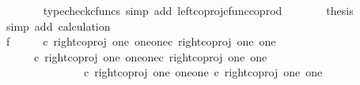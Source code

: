 \begin{isabellebody}
\ \ \ \ \ \ \isamarkupfalse%
\ {\isacharparenleft}{\kern0pt}typecheck{\isacharunderscore}{\kern0pt}cfuncs{\isacharcomma}{\kern0pt}\ simp\ add{\isacharcolon}{\kern0pt}\ left{\isacharunderscore}{\kern0pt}coproj{\isacharunderscore}{\kern0pt}cfunc{\isacharunderscore}{\kern0pt}coprod{\isacharparenright}{\kern0pt}\isanewline
\ \ \ \ \isamarkupfalse%
\ \isamarkupfalse%
\ {\isacharquery}{\kern0pt}thesis\isanewline
\ \ \ \ \ \ \isamarkupfalse%
\ {\isacharparenleft}{\kern0pt}simp\ add{\isacharcolon}{\kern0pt}\ calculation{\isacharparenright}{\kern0pt}\isanewline
\ \ \isamarkupfalse%
\isanewline
\ \ \isamarkupfalse%
\ f{}{\isacharcolon}{\kern0pt}\ {\isachardoublequoteopen}{\isasymlangle}{\isasymt}{\isacharcomma}{\kern0pt}{\isasymt}{\isasymrangle}\ {\isasymamalg}\ {\isasymlangle}{\isasymt}{\isacharcomma}{\kern0pt}{\isasymf}{\isasymrangle}\ {\isasymamalg}\ {\isasymlangle}{\isasymf}{\isacharcomma}{\kern0pt}{\isasymt}{\isasymrangle}\ {\isasymcirc}\isactrlsub c\ {\isacharparenleft}{\kern0pt}right{\isacharunderscore}{\kern0pt}coproj\ one\ {\isacharparenleft}{\kern0pt}one{\isasymCoprod}one{\isacharparenright}{\kern0pt}{\isasymcirc}\isactrlsub c\ right{\isacharunderscore}{\kern0pt}coproj\ one\ one{\isacharparenright}{\kern0pt}\ {\isacharequal}{\kern0pt}\ {\isasymlangle}{\isasymf}{\isacharcomma}{\kern0pt}{\isasymt}{\isasymrangle}{\isachardoublequoteclose}\isanewline
\ \ \isamarkupfalse%
{\isacharminus}{\kern0pt}\ \isanewline
\ \ \ \ \isamarkupfalse%
\ {\isachardoublequoteopen}{\isasymlangle}{\isasymt}{\isacharcomma}{\kern0pt}{\isasymt}{\isasymrangle}\ {\isasymamalg}\ {\isasymlangle}{\isasymt}{\isacharcomma}{\kern0pt}{\isasymf}{\isasymrangle}\ {\isasymamalg}\ {\isasymlangle}{\isasymf}{\isacharcomma}{\kern0pt}{\isasymt}{\isasymrangle}\ {\isasymcirc}\isactrlsub c\ {\isacharparenleft}{\kern0pt}right{\isacharunderscore}{\kern0pt}coproj\ one\ {\isacharparenleft}{\kern0pt}one{\isasymCoprod}one{\isacharparenright}{\kern0pt}{\isasymcirc}\isactrlsub c\ right{\isacharunderscore}{\kern0pt}coproj\ one\ one{\isacharparenright}{\kern0pt}\ {\isacharequal}{\kern0pt}\ \isanewline
\ \ \ \ \ \ \ \ \ \ {\isacharparenleft}{\kern0pt}{\isasymlangle}{\isasymt}{\isacharcomma}{\kern0pt}{\isasymt}{\isasymrangle}\ {\isasymamalg}\ {\isasymlangle}{\isasymt}{\isacharcomma}{\kern0pt}{\isasymf}{\isasymrangle}\ {\isasymamalg}\ {\isasymlangle}{\isasymf}{\isacharcomma}{\kern0pt}{\isasymt}{\isasymrangle}\ {\isasymcirc}\isactrlsub c\ right{\isacharunderscore}{\kern0pt}coproj\ one\ {\isacharparenleft}{\kern0pt}one{\isasymCoprod}one{\isacharparenright}{\kern0pt}\ {\isacharparenright}{\kern0pt}{\isasymcirc}\isactrlsub c\ right{\isacharunderscore}{\kern0pt}coproj\ one\ one{\isachardoublequoteclose}\isanewline

\end{isabellebody}

